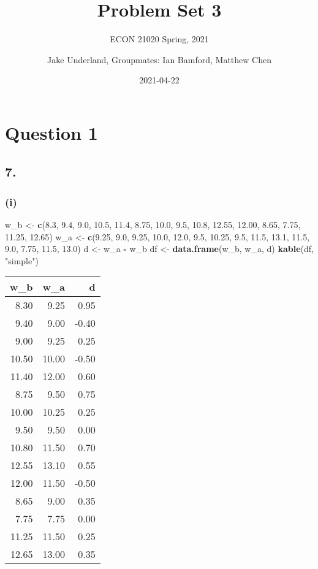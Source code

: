 \documentclass[
]{article}
\title{Problem Set 3}
\subtitle{ECON 21020 Spring, 2021}
\author{Jake Underland, Groupmates: Ian Bamford, Matthew Chen}
\date{2021-04-22}
\newenvironment{Shaded}{\begin{snugshade}}{\end{snugshade}}
\newcommand{\FloatTok}[1]{\textcolor[rgb]{0.00,0.00,0.81}{#1}}
\newcommand{\KeywordTok}[1]{\textcolor[rgb]{0.13,0.29,0.53}{\textbf{#1}}}
\newcommand{\NormalTok}[1]{#1}
\newcommand{\OperatorTok}[1]{\textcolor[rgb]{0.81,0.36,0.00}{\textbf{#1}}}
\newcommand{\StringTok}[1]{\textcolor[rgb]{0.31,0.60,0.02}{#1}}
\begin{document}
\maketitle

{
\setcounter{tocdepth}{2}
\tableofcontents
}
\hypertarget{question-1}{%
\section{Question 1}\label{question-1}}

\hypertarget{section}{%
\subsection{7.}\label{section}}

\hypertarget{i}{%
\subsubsection{(i)}\label{i}}

\begin{Shaded}
\begin{Highlighting}[]
\NormalTok{w_b <-}\StringTok{ }\KeywordTok{c}\NormalTok{(}\FloatTok{8.3}\NormalTok{, }\FloatTok{9.4}\NormalTok{, }\FloatTok{9.0}\NormalTok{, }\FloatTok{10.5}\NormalTok{, }\FloatTok{11.4}\NormalTok{, }\FloatTok{8.75}\NormalTok{, }\FloatTok{10.0}\NormalTok{, }\FloatTok{9.5}\NormalTok{, }\FloatTok{10.8}\NormalTok{, }\FloatTok{12.55}\NormalTok{, }\FloatTok{12.00}\NormalTok{, }\FloatTok{8.65}\NormalTok{, }\FloatTok{7.75}\NormalTok{, }\FloatTok{11.25}\NormalTok{, }\FloatTok{12.65}\NormalTok{) }
\NormalTok{w_a <-}\StringTok{ }\KeywordTok{c}\NormalTok{(}\FloatTok{9.25}\NormalTok{, }\FloatTok{9.0}\NormalTok{, }\FloatTok{9.25}\NormalTok{, }\FloatTok{10.0}\NormalTok{, }\FloatTok{12.0}\NormalTok{, }\FloatTok{9.5}\NormalTok{, }\FloatTok{10.25}\NormalTok{, }\FloatTok{9.5}\NormalTok{, }\FloatTok{11.5}\NormalTok{, }\FloatTok{13.1}\NormalTok{, }\FloatTok{11.5}\NormalTok{, }\FloatTok{9.0}\NormalTok{, }\FloatTok{7.75}\NormalTok{, }\FloatTok{11.5}\NormalTok{, }\FloatTok{13.0}\NormalTok{) }
\NormalTok{d <-}\StringTok{ }\NormalTok{w_a }\OperatorTok{-}\StringTok{ }\NormalTok{w_b}
\NormalTok{df <-}\StringTok{ }\KeywordTok{data.frame}\NormalTok{(w_b, w_a, d)}
\KeywordTok{kable}\NormalTok{(df, }\StringTok{"simple"}\NormalTok{)}
\end{Highlighting}
\end{Shaded}

\begin{longtable}[]{@{}rrr@{}}
\toprule
w\_b & w\_a & d\tabularnewline
\midrule
\endhead
8.30 & 9.25 & 0.95\tabularnewline
9.40 & 9.00 & -0.40\tabularnewline
9.00 & 9.25 & 0.25\tabularnewline
10.50 & 10.00 & -0.50\tabularnewline
11.40 & 12.00 & 0.60\tabularnewline
8.75 & 9.50 & 0.75\tabularnewline
10.00 & 10.25 & 0.25\tabularnewline
9.50 & 9.50 & 0.00\tabularnewline
10.80 & 11.50 & 0.70\tabularnewline
12.55 & 13.10 & 0.55\tabularnewline
12.00 & 11.50 & -0.50\tabularnewline
8.65 & 9.00 & 0.35\tabularnewline
7.75 & 7.75 & 0.00\tabularnewline
11.25 & 11.50 & 0.25\tabularnewline
12.65 & 13.00 & 0.35\tabularnewline
\bottomrule
\end{longtable}
\end{document}
